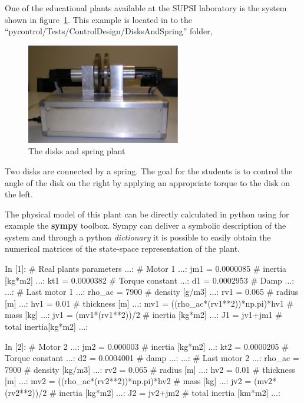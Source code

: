 One of the educational plants available at the SUPSI laboratory is the system 
shown in figure~\ref{F20}. This example is located in to the 
``pycontrol/Tests/ControlDesign/DisksAndSpring'' folder,

\begin{figure}[htbp]	%
\centering
\includegraphics[width=0.6\textwidth]{eps/disks.eps}
\caption{The disks and spring plant}
\label{F20}
\end{figure}

Two disks are connected by a spring. The goal for the students is to control 
the angle of the disk on the right by applying an appropriate torque to the 
disk on the left.

The physical model of this plant can be directly calculated in python using for 
example the \textbf{sympy} toolbox.
Sympy can deliver a symbolic description of the system and through a python 
\textit{dictionary} it is possible to easily obtain the numerical matrices of 
the state-space representation of the plant.

\begin{code}
In [1]: # Real plants parameters
   ...: # Motor 1
   ...: jm1 = 0.0000085  # inertia [kg*m2]
   ...: kt1 = 0.0000382  # Torque constant
   ...: d1 = 0.0002953  # Damp
   ...: 
   ...: # Last motor 1
   ...: rho_ac = 7900  # density [g/m3]
   ...: rv1 = 0.065    # radius [m] 
   ...: hv1 = 0.01     # thickness [m]
   ...: mv1 = ((rho_ac*(rv1**2))*np.pi)*hv1   # mass [kg]
   ...: jv1 = (mv1*(rv1**2))/2   # inertia [kg*m2]
   ...: J1 = jv1+jm1   # total inertia[kg*m2]
   ...: 
\end{code}

\begin{code}
In [2]: # Motor 2
   ...: jm2 = 0.000003   # inertia [kg*m2]
   ...: kt2 = 0.0000205  # Torque constant
   ...: d2 = 0.0004001 # damp
   ...: 
   ...: # Last motor 2
   ...: rho_ac = 7900   # density [kg/m3]
   ...: rv2 = 0.065     # radius [m] 
   ...: hv2 = 0.01      # thickness [m]
   ...: mv2 = ((rho_ac*(rv2**2))*np.pi)*hv2   # mass [kg]
   ...: jv2 = (mv2*(rv2**2))/2              # inertia [kg*m2]
   ...: J2 = jv2+jm2                   # total inertia [km*m2]
   ...: 
\end{code}

